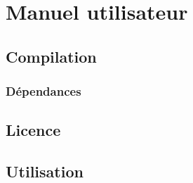\chapter{Manuel utilisateur}
\section{Compilation}

\subsection{Dépendances}

\section{Licence}

\section{Utilisation}
